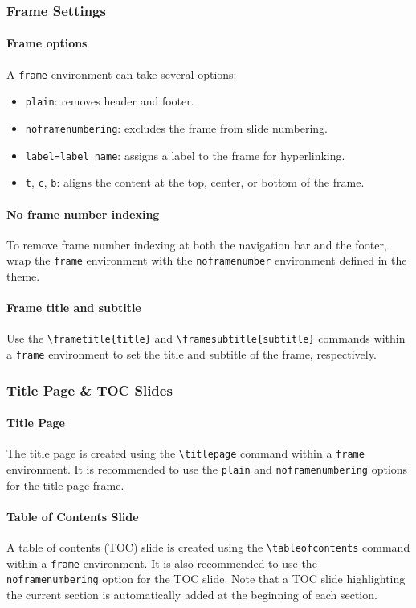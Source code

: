 \begin{frame}
  \frametitle{Frame Settings}

  \paragraph{Frame options}
  A \Verb|frame| environment can take several options:
  \begin{itemize}
    \item \Verb|plain|: removes header and footer.
    \item \Verb|noframenumbering|: excludes the frame from slide numbering.
    \item \Verb|label=label_name|: assigns a label to the frame for hyperlinking.
    \item \Verb|t|, \Verb|c|, \Verb|b|: aligns the content at the top, center, or bottom of the frame.
  \end{itemize}
  
  \paragraph{No frame number indexing}
  To remove frame number indexing at both the navigation bar and the footer, wrap the \Verb|frame| environment with the \Verb|noframenumber| environment defined in the theme.

  \paragraph{Frame title and subtitle}
  Use the \Verb|\frametitle{title}| and \Verb|\framesubtitle{subtitle}| commands within a \Verb|frame| environment to set the title and subtitle of the frame, respectively.

\end{frame}

\begin{frame}
  \frametitle{Title Page \& TOC Slides}

  \paragraph{Title Page}
  The title page is created using the \Verb|\titlepage| command within a \Verb|frame| environment.
  It is recommended to use the \Verb|plain| and \Verb|noframenumbering| options for the title page frame.

  \paragraph{Table of Contents Slide}
  A table of contents (TOC) slide is created using the \Verb|\tableofcontents| command within a \Verb|frame| environment.
  It is also recommended to use the \Verb|noframenumbering| option for the TOC slide.
  Note that a TOC slide highlighting the current section is automatically added at the beginning of each section.

\end{frame}


